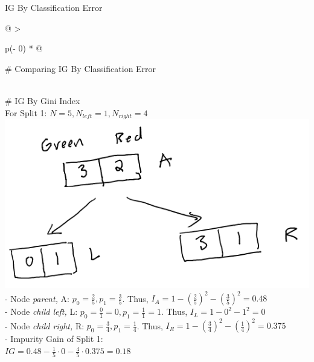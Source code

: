\documentclass[
  ignorenonframetext,
]{beamer}
\begin{document}
\begin{frame}{IG By Classification Error}
\begin{longtable}[]{@{}
  >{\raggedright\arraybackslash}p{(\columnwidth - 0\tabcolsep) * }@{}}
\toprule
\begin{minipage}[b]{\linewidth}\raggedright
\# Comparing IG By Classification Error
\end{minipage} \\
\midrule
\endhead
\# IG By Gini Index \\
For Split 1: \(N = 5, N_{left} =1, N_{right} = 4\) \\
\includegraphics{images/im1.png} \\
- Node \emph{parent,} A: \(p_0 = \frac{2}{5}, p_1 = \frac{3}{5}\). Thus,
\(I_{A} = 1 - (\frac{2}{5})^2-(\frac{3}{5})^2 = 0.48\) \\
- Node \emph{child left,} L:
\(p_0 = \frac{0}{1} = 0, p_1 = \frac{1}{1} = 1\). Thus,
\(I_{L} = 1 -0^2-1^2 = 0\) \\
- Node \emph{child right,} R: \(p_0 = \frac{3}{4}, p_1 = \frac{1}{4}\).
Thus, \(I_{R} = 1-(\frac{3}{4})^2-(\frac{1}{4})^2 = 0.375\) \\
- Impurity Gain of Split 1: \\
\(IG = 0.48 - \frac{1}{5} \cdot 0-\frac{4}{5} \cdot 0.375 = 0.18\) \\
\bottomrule
\end{longtable}
\end{frame}
\end{document}
